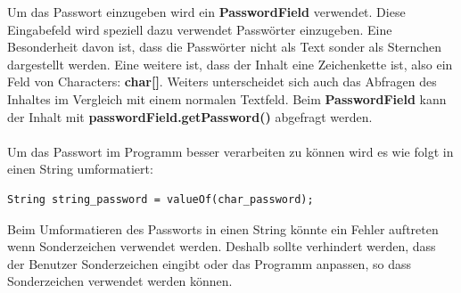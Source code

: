 \vspace{10pt}

Um das Passwort einzugeben wird ein \textbf{PasswordField} verwendet. Diese Eingabefeld wird speziell dazu verwendet Passwörter einzugeben. Eine Besonderheit davon ist, dass die Passwörter nicht als Text sonder als Sternchen dargestellt werden. Eine weitere ist, dass der Inhalt eine Zeichenkette ist, also ein Feld von Characters: \textbf{char[]}. Weiters unterscheidet sich auch das Abfragen des Inhaltes im Vergleich mit einem normalen Textfeld. Beim \textbf{PasswordField} kann der Inhalt mit \textbf{passwordField.getPassword()} abgefragt werden.
\\ \\ Um das Passwort im Programm besser verarbeiten zu können wird es wie folgt in einen String umformatiert:
\begin{lstlisting}[style=Javastyle, caption=char zu String]
	String string_password = valueOf(char_password);
\end{lstlisting}
Beim Umformatieren des Passworts in einen String könnte ein Fehler auftreten wenn Sonderzeichen verwendet werden. Deshalb sollte verhindert werden, dass der Benutzer Sonderzeichen eingibt oder das Programm anpassen, so dass Sonderzeichen verwendet werden können.

\vspace{10pt}

